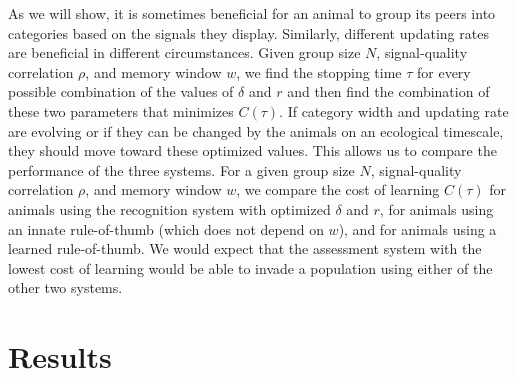 As we will show, it is sometimes beneficial for an animal to group its peers into categories based on the signals they display. Similarly, different updating rates are beneficial in different circumstances. Given group size $N$, signal-quality correlation $\rho$, and memory window $w$, we find the stopping time $\tau$ for every possible combination of the values of $\delta$ and $r$ and then find the combination of these two parameters that minimizes $C(\tau)$. If category width and updating rate are evolving or if they can be changed by the animals on an ecological timescale, they should move toward these optimized values. This allows us to compare the performance of the three systems. For a given group size $N$, signal-quality correlation $\rho$, and memory window $w$, we compare the cost of learning $C(\tau)$ for animals using the recognition system with optimized $\delta$ and $r$, for animals using an innate rule-of-thumb (which does not depend on $w$), and for animals using a learned rule-of-thumb. We would expect that the assessment system with the lowest cost of learning would be able to invade a population using either of the other two systems.





\section*{Results}
